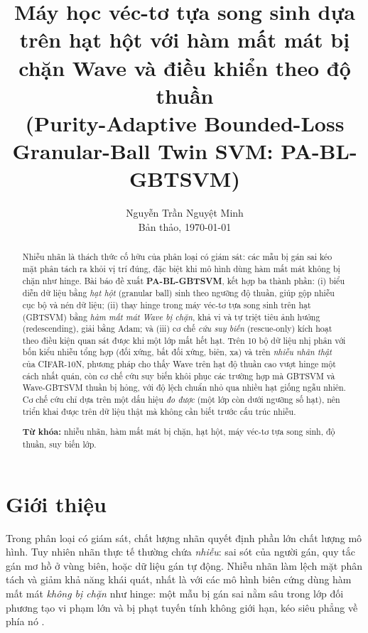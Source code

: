 \documentclass[11pt,a4paper]{article}
\title{\textbf{Máy học véc-tơ tựa song sinh dựa trên hạt hột với hàm mất mát bị chặn Wave và điều khiển theo độ thuần\\ \large (Purity-Adaptive Bounded-Loss Granular-Ball Twin SVM: PA-BL-GBTSVM)}}
\author{Nguyễn Trần Nguyệt Minh\\ \small Bản thảo, \today}
\date{}
\begin{document}
\maketitle

\begin{abstract}
\noindent
Nhiễu nhãn là thách thức cố hữu của phân loại có giám sát: các mẫu bị gán sai kéo mặt phân tách ra khỏi vị trí đúng, đặc biệt khi mô hình dùng hàm mất mát không bị chặn như hinge. Bài báo đề xuất \textbf{PA-BL-GBTSVM}, kết hợp ba thành phần: (i) biểu diễn dữ liệu bằng \emph{hạt hột} (granular ball) sinh theo ngưỡng độ thuần, giúp gộp nhiễu cục bộ và nén dữ liệu; (ii) thay hinge trong máy véc-tơ tựa song sinh trên hạt (GBTSVM) bằng \emph{hàm mất mát Wave bị chặn}, khả vi và tự triệt tiêu ảnh hưởng (redescending), giải bằng Adam; và (iii) cơ chế \emph{cứu suy biến} (rescue-only) kích hoạt theo điều kiện quan sát được khi một lớp mất hết hạt. Trên 10 bộ dữ liệu nhị phân với bốn kiểu nhiễu tổng hợp (đối xứng, bất đối xứng, biên, xa) và trên \emph{nhiễu nhãn thật} của CIFAR-10N, phương pháp cho thấy Wave trên hạt độ thuần cao vượt hinge một cách nhất quán, còn cơ chế cứu suy biến khôi phục các trường hợp mà GBTSVM và Wave-GBTSVM thuần bị hỏng, với độ lệch chuẩn nhỏ qua nhiều hạt giống ngẫu nhiên. Cơ chế cứu chỉ dựa trên một dấu hiệu \emph{đo được} (một lớp còn dưới ngưỡng số hạt), nên triển khai được trên dữ liệu thật mà không cần biết trước cấu trúc nhiễu.

\medskip
\noindent\textbf{Từ khóa:} nhiễu nhãn, hàm mất mát bị chặn, hạt hột, máy véc-tơ tựa song sinh, độ thuần, suy biến lớp.
\end{abstract}

\section{Giới thiệu}
\label{sec:intro}

Trong phân loại có giám sát, chất lượng nhãn quyết định phần lớn chất lượng mô hình. Tuy nhiên nhãn thực tế thường chứa \emph{nhiễu}: sai sót của người gán, quy tắc gán mơ hồ ở vùng biên, hoặc dữ liệu gán tự động. Nhiễu nhãn làm lệch mặt phân tách và giảm khả năng khái quát, nhất là với các mô hình biên cứng dùng hàm mất mát \emph{không bị chặn} như hinge: một mẫu bị gán sai nằm sâu trong lớp đối phương tạo vi phạm lớn và bị phạt tuyến tính không giới hạn, kéo siêu phẳng về phía nó \cite{frenay2014}.
\end{document}
